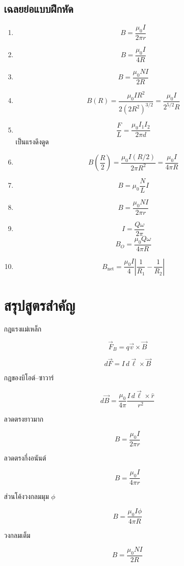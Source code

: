 \subsection*{เฉลยย่อแบบฝึกหัด}

\begin{enumerate}
    \item
    \[
    B=\frac{\mu_0I}{2\pi r}
    \]

    \item
    \[
    B=\frac{\mu_0I}{4R}
    \]

    \item
    \[
    B=\frac{\mu_0NI}{2R}
    \]

    \item
    \[
    B(R)
    =
    \frac{\mu_0IR^2}{2(2R^2)^{3/2}}
    =
    \frac{\mu_0I}{2^{5/2}R}
    \]

    \item
    \[
    \frac{F}{L}=\frac{\mu_0I_1I_2}{2\pi d}
    \]
    เป็นแรงดึงดูด

    \item
    \[
    B\left(\frac{R}{2}\right)
    =
    \frac{\mu_0I(R/2)}{2\pi R^2}
    =
    \frac{\mu_0I}{4\pi R}
    \]

    \item
    \[
    B=\mu_0\frac{N}{L}I
    \]

    \item
    \[
    B=\frac{\mu_0NI}{2\pi r}
    \]

    \item
    \[
    I=\frac{Q\omega}{2\pi}
    \]
    \[
    B_O=\frac{\mu_0Q\omega}{4\pi R}
    \]

    \item
    \[
    B_{\text{net}}
    =
    \frac{\mu_0I}{4}
    \left|
    \frac{1}{R_1}-\frac{1}{R_2}
    \right|
    \]
\end{enumerate}

\section{สรุปสูตรสำคัญ}

\begin{tcolorbox}[title={สรุปบท: สนามแม่เหล็กจากวงจรไฟฟ้า}]
กฎแรงแม่เหล็ก

\[
\vec{F}_B=q\vec{v}\times\vec{B}
\]

\[
d\vec{F}=I\,d\vec{\ell}\times\vec{B}
\]

กฎของบิโอต์--ซาวาร์

\[
d\vec{B}
=
\frac{\mu_0}{4\pi}
\frac{I\,d\vec{\ell}\times\hat{r}}{r^2}
\]

ลวดตรงยาวมาก

\[
B=\frac{\mu_0I}{2\pi r}
\]

ลวดตรงกึ่งอนันต์

\[
B=\frac{\mu_0I}{4\pi r}
\]

ส่วนโค้งวงกลมมุม $\phi$

\[
B=\frac{\mu_0I\phi}{4\pi R}
\]

วงกลมเต็ม

\[
B=\frac{\mu_0NI}{2R}
\]
\end{tcolorbox}


